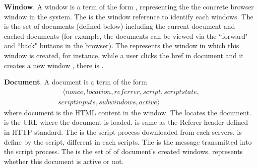 \vspace{1mm}
\noindent\textbf{Window}. A window  is a term of the form , representing the  the concrete browser window in the system. The  is the window reference to identify each windows. The  is the set of documents (defined below) including the current document and cached documents (for example, the documents can be viewed via the ``forward" and ``back" buttons in the browser). The  represents the window in which this window is created, for instance, while a user clicks the href in document  and it creates a new window , there is .

\vspace{1mm}
\noindent\textbf{Document}. A document  is a term of the form
\begin{multline*}
  \ \ \ \langle nonce, location, referrer, script, scriptstate, \\
  scriptinputs, subwindows, active \rangle \ \ \
\end{multline*}
where document is the HTML content in the window.  The  locates the document.  is the URL where the document is loaded.  is same as the Referer header defined in HTTP standard. The  is the script process downloaded from each servers.  is define by the script, different in each scripts. The  is the message transmitted into the script process. The  is the set of  of document's created windows.  represents whether this document is active or not.

